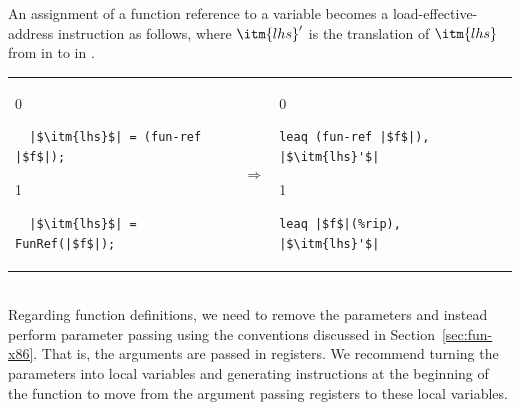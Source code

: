 \documentclass[7x10,nocrop]{TimesAPriori_MIT}%
\def\racketEd{0}
\def\pythonEd{1}
\def\edition{1}
\begin{document}
An assignment of a function reference to a variable becomes a
load-effective-address instruction as follows, where $\itm{lhs}'$
is the translation of $\itm{lhs}$ from \Atm{} in \LangCFun{}
to \Arg{} in \LangXIndCallVar{}. \\
\begin{tabular}{lcl}
\begin{minipage}{0.35\textwidth}
{\if\edition\racketEd
\begin{lstlisting}
  |$\itm{lhs}$| = (fun-ref |$f$|);
\end{lstlisting}
\fi}
{\if\edition\pythonEd
\begin{lstlisting}
  |$\itm{lhs}$| = FunRef(|$f$|);
\end{lstlisting}
\fi}
\end{minipage}
&
$\Rightarrow$\qquad\qquad
&
\begin{minipage}{0.3\textwidth}
{\if\edition\racketEd
\begin{lstlisting}
leaq (fun-ref |$f$|), |$\itm{lhs}'$|
\end{lstlisting}
\fi}
{\if\edition\pythonEd
\begin{lstlisting}
leaq |$f$|(%rip), |$\itm{lhs}'$|
\end{lstlisting}
\fi}
\end{minipage}
\end{tabular} \\

Regarding function definitions, we need to remove the parameters and
instead perform parameter passing using the conventions discussed in
Section~\ref{sec:fun-x86}. That is, the arguments are passed in
registers. We recommend turning the parameters into local variables
and generating instructions at the beginning of the function to move
from the argument passing registers to these local variables.
\end{document}
